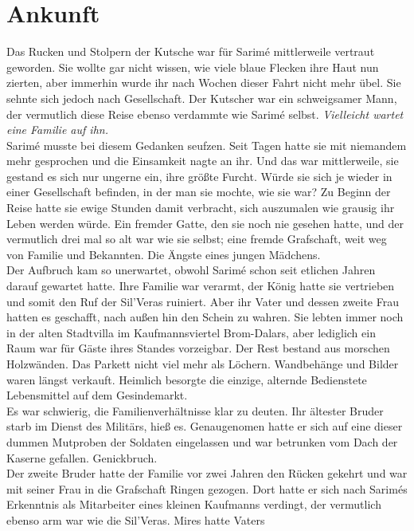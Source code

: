 \chapter{Ankunft}

Das Rucken und Stolpern der Kutsche war für Sarimé mittlerweile vertraut geworden. Sie wollte gar 
nicht wissen, wie viele blaue Flecken ihre Haut nun zierten, aber immerhin wurde ihr nach Wochen 
dieser Fahrt nicht mehr übel. Sie sehnte sich jedoch nach Gesellschaft. Der Kutscher war ein 
schweigsamer Mann, der vermutlich diese Reise ebenso verdammte wie Sarimé selbst.
\textit{Vielleicht wartet eine Familie auf ihn.}\\
Sarimé musste bei diesem Gedanken seufzen. Seit Tagen hatte sie mit niemandem mehr gesprochen und 
die Einsamkeit nagte an ihr. Und das war mittlerweile, sie gestand es sich nur ungerne ein, ihre 
größte Furcht. Würde sie sich je wieder in einer Gesellschaft befinden, in der man sie mochte, wie 
sie war? Zu Beginn der Reise hatte sie ewige Stunden damit verbracht, sich auszumalen wie grausig 
ihr Leben werden würde. Ein fremder Gatte, den sie noch nie gesehen hatte, und der vermutlich drei 
mal so alt war wie sie selbst; eine fremde Grafschaft, weit weg von Familie und Bekannten. Die 
Ängste eines jungen Mädchens.\\
Der Aufbruch kam so unerwartet, obwohl Sarimé schon seit etlichen Jahren darauf gewartet hatte. Ihre 
Familie war verarmt, der König hatte sie vertrieben und somit den Ruf der Sil'Veras ruiniert. Aber 
ihr Vater und dessen zweite Frau hatten es geschafft, nach außen hin den Schein zu wahren. Sie 
lebten immer noch in der alten Stadtvilla im Kaufmannsviertel Brom-Dalars, aber lediglich ein Raum 
war für Gäste ihres Standes vorzeigbar. Der Rest bestand aus morschen Holzwänden. Das Parkett 
nicht viel mehr als Löchern. Wandbehänge und Bilder waren längst verkauft. Heimlich besorgte 
die einzige, alternde Bedienstete Lebensmittel auf dem Gesindemarkt.\\
Es war schwierig, die Familienverhältnisse klar zu deuten. Ihr ältester Bruder starb im Dienst des 
Militärs, hieß es. Genaugenomen hatte er sich auf eine dieser dummen Mutproben der Soldaten 
eingelassen und war betrunken vom Dach der Kaserne gefallen. Genickbruch. \\
Der zweite Bruder hatte der Familie vor zwei Jahren den Rücken gekehrt und war mit seiner Frau in 
die Grafschaft Ringen gezogen. Dort hatte er sich nach Sarimés Erkenntnis als Mitarbeiter eines 
kleinen Kaufmanns verdingt, der vermutlich ebenso arm war wie die Sil'Veras. Mires hatte Vaters 
